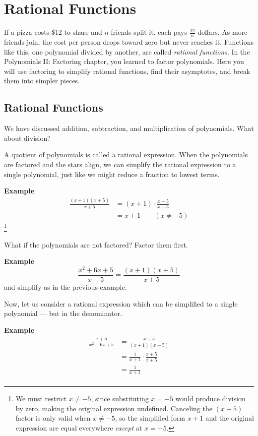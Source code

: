 \chapter{Rational Functions}

If a pizza costs \$12 to share and $n$ friends split it, each pays $\frac{12}{n}$ dollars. As more friends join,
the cost per person drops toward zero but never reaches it. Functions like this, one polynomial divided by
another, are called \emph{rational functions}. In the Polynomials II: Factoring chapter, you learned to factor
polynomials. Here you will use factoring to simplify rational functions, find their asymptotes, and break them
into simpler pieces.

\section{Rational Functions}
We have discussed addition, subtraction, and multiplication of polynomials. What about division?

A quotient of polynomials is called a rational expression. When the polynomials are factored and the stars align, we can simplify the rational expression to a single polynomial, just like we might reduce a fraction to lowest terms.

\textbf{Example} 
\begin{equation} \label{eq1}
\begin{split}
\frac{(x + 1)(x + 5)}{x + 5} & = (x + 1) \cdot \frac{x+5}{x+5} \\
& = x + 1 \qquad (x\ne -5)
\end{split}
\end{equation}\footnote{We must restrict $x \ne -5$, since substituting $x=-5$ would produce division by zero, making the original expression undefined. Canceling the $(x+5)$ factor is only valid when $x \ne -5$, so the simplified form $x+1$ and the original expression are equal everywhere \emph{except} at $x=-5$.}

What if the polynomials are not factored? Factor them first.

\textbf{Example} 
\[ \frac{x^2 + 6x + 5}{x + 5} = \frac{(x + 1)(x + 5)}{x + 5} \]
and simplify as in the previous example.

Now, let us consider a rational expression which can be simplified to a single polynomial --- but in the denominator.

\textbf{Example}
\begin{equation} \label{eq1_2}
\begin{split}
\frac{x + 5}{x^2 + 6x + 5} & = \frac{x + 5}{(x + 1)(x + 5)} \\
& = \frac{1}{x+1} \cdot \frac{x+5}{x+5} \\
& = \frac{1}{x+1} \\
\end{split}
\end{equation}

